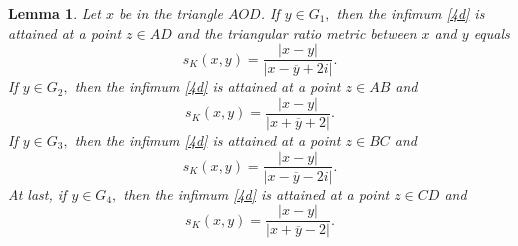 \documentclass[12pt,a4paper]{amsart}
\newtheorem{lemma}{Lemma}
\begin{document}

\begin{lemma}\label{l1}
        Let $x$ be in the triangle $AOD$. If $y\in G_1,$ then the infimum \eqref{4d} is attained at a point $z\in AD$ and the triangular ratio metric between $x$ and $y$ equals
\begin{equation}\label{5d}
\displaystyle s_K(x,y) = \frac{|x-y|}{|x-\overline{y}+2i|}.
\end{equation}
If $y\in G_2,$ then the infimum \eqref{4d} is attained at  a point $z\in AB$ and
\begin{equation}\label{6d}
\displaystyle s_K(x,y) = \frac{|x-y|}{|x+\overline{y}+2|}.
\end{equation}
If $y\in G_3,$ then the infimum \eqref{4d}  is attained at  a point $z\in BC$ and
\begin{equation}\label{7d}
\displaystyle s_K(x,y) = \frac{|x-y|}{|x-\overline{y}-2i|}.
\end{equation}
At last, if $y\in G_4,$ then the infimum \eqref{4d}  is attained at  a point $z\in CD$ and
\begin{equation}\label{8d}
\displaystyle s_K(x,y) = \frac{|x-y|}{|x+\overline{y}-2|}.
\end{equation}
\end{lemma}
\end{document}

